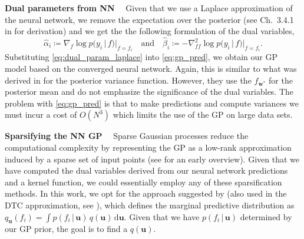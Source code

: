 \documentclass{article}
\renewcommand{\paragraph}[1]{{\bf #1}~~}
\newcommand{\mbf}[1]{\mathbf{#1}}
\renewcommand{\mid}{\,|\,}
\newcommand{\vu}{\mbf{u}}
\newcommand{\vw}{\mbf{w}}
\begin{document}
\paragraph{Dual parameters from NN}
Given that we use a Laplace approximation of the neural network, we remove the expectation over the posterior (see Ch.~3.4.1 in \cite{rasmussen2006gaussian} for derivation) and we get the the following formulation of the dual variables,
%
\begin{equation}
  \label{eq:dual_param_laplace}
  \hat{\alpha}_i \coloneqq \nabla_{f}\log p(y_i \mid f) |_{f=f_i}
  \quad \text{and} \quad
  \hat{\beta}_i \coloneqq - \nabla^2_{ff}\log p(y_i \mid f) |_{f=f_i}.
\end{equation}
%
Substituting \cref{eq:dual_param_laplace} into \cref{eq:gp_pred}, we obtain our GP model based on the converged neural network. Again, this is similar to what was derived in \citet{immer2021improving} for the posterior variance function. However, they use the $f_{\vw^*}$ for the posterior mean and do not emphasize the significance of the dual variables. The problem with \cref{eq:gp_pred} is that to make predictions and compute variances we must incur a cost of $O(N^3)$ which limits the use of the GP on large data sets.

\paragraph{Sparsifying the NN GP}
\label{sec:sparse-dual-gp}
%
Sparse Gaussian processes reduce the computational complexity by representing the GP as a low-rank approximation induced by a sparse set of input points (see \cite{quinonero2005unifying} for an early overview). Given that we have computed the dual variables derived from our neural network predictions and a kernel function, we could essentially employ any of these sparsification methods. In this work, we opt for the approach suggested by \citet{titsias2009variational} (also used in the DTC approximation, see \cite{quinonero2005unifying}), which defines the marginal predictive distribution as $q_{\vu}(f_i)  = \int p(f_i  \mid \vu) \, q(\vu) \, \mathrm{d}\vu$. Given that we have $p(f_i \mid \vu)$ determined by our GP prior, the goal is to find a $q(\vu)$. 
\end{document}
